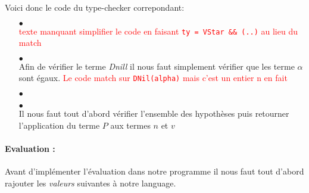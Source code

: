 \documentclass {article}
\newcommand{\codefrom}[3]
           {}
\theoremstyle{definition}
\theoremstyle{remark}
\newcommand{\todo}[1]{\textcolor{red}{#1}}
\newcommand{\fun}[1]{\lstinline!#1!}
\begin{document}
Voici donc le code du type-checker correpondant:
\begin{itemize}
  
\item[$\bullet$] \\
  
  \todo{texte manquant} \todo{simplifier le code en faisant \fun{ty = VStar && (..)} au lieu du match}
  \codefrom{dependent}{lambda}{check_vec}

  
\item[$\bullet$] \\
  Afin de vérifier le terme \emph{Dnill} il nous faut simplement vérifier que les terme $\alpha$
  sont égaux.  \todo{Le code match sur \fun{DNil(alpha)} mais c'est un entier n en fait}
  \codefrom{dependent}{lambda}{check_dnil}

\item[$\bullet$] \\
  \codefrom{dependent}{lambda}{check_dcons}


\item[$\bullet$] \\
  Il nous faut tout d'abord vérifier l'ensemble des hypothèses puis retourner l'application du terme $P$
  aux termes $n$ et $v$
  \codefrom{dependent}{lambda}{synth_dfold}

    
\end{itemize}




\paragraph{Evaluation :} 
Avant d'implémenter l'évaluation dans notre programme il nous faut tout d'abord
rajouter les \emph{valeurs} suivantes à notre language.
\codefrom{dependent}{lambda}{Value_Vector}
\end{document}
